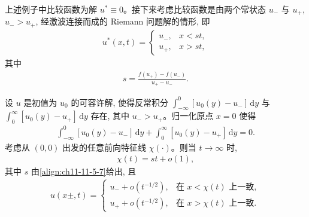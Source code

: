 \documentclass[../../main.tex]{subfiles}
\begin{document}
上述例子中比较函数为解 $u^*\equiv0$。接下来考虑比较函数是由两个常状态 $u_-$ 与 $u_+$, $u_->u_+$, 经激波连接而成的 Riemann 问题解的情形, 即
\begin{align}
u^*(x,t)=
\begin{cases}
u_-, & x<st,\\
u_+, & x>st,
\end{cases}\label{align:ch11-11-5-6}
\end{align}
其中
\begin{align}
s=\frac{f(u_+)-f(u_-)}{u_+-u_-}.\label{align:ch11-11-5-7}
\end{align}

\begin{theorem}\label{theorem:ch11-11-5-3}
设 $u$ 是初值为 $u_0$ 的可容许解, 使得反常积分 $\int_{-\infty}^0[u_0(y)-u_-]\,\mathrm{d}y$ 与 $\int_0^\infty[u_0(y)-u_+]\,\mathrm{d}y$ 存在, 其中 $u_->u_+$。归一化原点 $x=0$ 使得
\begin{align}
\int_{-\infty}^0[u_0(y)-u_-]\,\mathrm{d}y+\int_0^\infty[u_0(y)-u_+]\,\mathrm{d}y=0.\label{align:ch11-11-5-8}
\end{align}
考虑从 $(0,0)$ 出发的任意前向特征线 $\chi(\cdot)$。则当 $t\to\infty$ 时,
\begin{align}
\chi(t)=st+o(1),\label{align:ch11-11-5-9}
\end{align}
其中 $s$ 由\eqref{align:ch11-11-5-7}给出, 且
\begin{align}
u(x\pm,t)=
\begin{cases}
u_-+o(t^{-1/2}), & \text{在 }x<\chi(t)\text{ 上一致},\\
u_++o(t^{-1/2}), & \text{在 }x>\chi(t)\text{ 上一致}.
\end{cases}\label{align:ch11-11-5-10}
\end{align}
\end{theorem}
\end{document}
